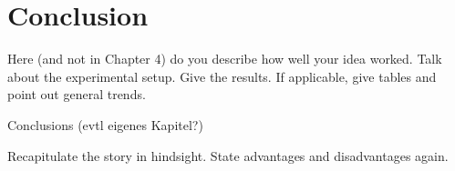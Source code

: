 





\chapter{Conclusion}

Here (and not in Chapter 4) do you describe how well your idea
worked. Talk about the experimental setup. Give the results. If
applicable, give tables and point out general trends.

Conclusions (evtl eigenes Kapitel?)

Recapitulate the story in hindsight. State advantages and
disadvantages again.




